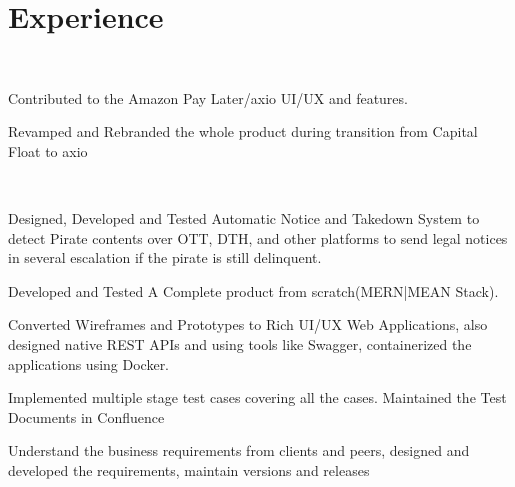 \documentclass[]{deedy-resume-openfont}
\begin{document}
\hfill
\begin{minipage}[t]{0.66\textwidth} 


\section{Experience}

\sectionsep\\
\vspace{\topsep} %
\begin{tightemize}
\item Contributed to the Amazon Pay Later/axio UI/UX and features.
\item Revamped and Rebranded the whole product during transition from Capital Float to axio
\end{tightemize}
\sectionsep

\sectionsep\\
\vspace{\topsep} %
\begin{tightemize}
\item Designed, Developed and Tested Automatic Notice and Takedown System to detect Pirate contents over OTT, DTH, and other platforms to send legal notices in several escalation if the pirate is still delinquent.
\item Developed and Tested A Complete product from scratch(MERN|MEAN Stack).
\item Converted Wireframes and Prototypes to Rich UI/UX Web Applications, also designed native REST APIs and using tools like Swagger, containerized the applications using Docker. 
\item Implemented multiple stage test cases covering all the cases. Maintained the Test Documents in Confluence
\item Understand the business requirements from clients and peers, designed and developed the requirements, maintain versions and releases 
\end{tightemize}
\sectionsep



\end{minipage}
\end{document}
